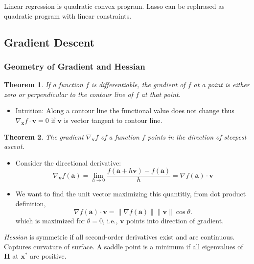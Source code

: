 \documentclass[11pt, %
	oneside, %
	english, %
	onehalfspacing, %
	parskip, %
	]{article} %
\newtheorem{theorem}{Theorem}
\theoremstyle{definition}
\begin{document}
Linear regression is quadratic convex program. Lasso can be rephrased as quadratic program with linear constraints.

\subsection{Gradient Descent}

\subsubsection*{Geometry of Gradient and Hessian}

\begin{theorem}
	If a function $f$ is differentiable, the gradient of $f$ at a point is either zero or perpendicular to the contour line of $f$ at that point.
\end{theorem}

\begin{itemize}
	\item Intuition: Along a contour line the functional value does not change thus $\nabla_\mathbf{x} f \cdot \mathbf{v} = 0$ if $\mathbf{v}$ is vector tangent to contour line.
\end{itemize}

\begin{theorem}
	The gradient $\nabla_{\mathbf{v}} f$ of a function $f$ points in the direction of steepest ascent.
\end{theorem}

\begin{itemize}
	\item Consider the directional derivative:
	\begin{equation*}
		\nabla_{\mathbf{v}} f(\mathbf{a})=\lim _{h \rightarrow 0} \frac{f(\mathbf{a}+h \mathbf{v})-f(\mathbf{a})}{h}=\nabla f(\mathbf{a}) \cdot \mathbf{v}
	\end{equation*}
	\item We want to find the unit vector maximizing this quantitiy, from dot product definition,
	\begin{equation*}
		\nabla f(\mathbf{a}) \cdot \mathbf{v}=\|\nabla f(\mathbf{a})\|\|\mathbf{v}\| \cos \theta.
	\end{equation*}
	which is maximized for $\theta = 0$, i.e., $\mathbf{v}$ points into direction of gradient.
\end{itemize}

\emph{Hessian} is symmetric if all second-order derivatives exist and are continuous. Captures curvature of surface. A saddle point is a minimum if all eigenvalues of $\mathbf{H}$ at $\mathbf{x}^*$ are positive.
\end{document}
